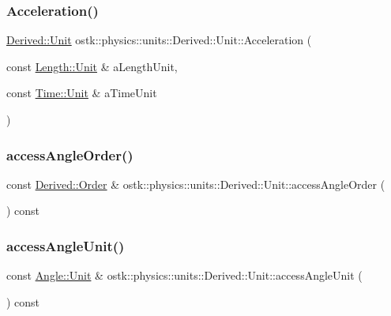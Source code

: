 \subsubsection{\texorpdfstring{Acceleration()}{Acceleration()}}
{\footnotesize\ttfamily \hyperlink{classostk_1_1physics_1_1units_1_1_derived_1_1_unit}{Derived\+::\+Unit} ostk\+::physics\+::units\+::\+Derived\+::\+Unit\+::\+Acceleration (\begin{DoxyParamCaption}\item[{const \hyperlink{classostk_1_1physics_1_1units_1_1_length_a2664470a7eedf5d45c88861fe69badea}{Length\+::\+Unit} \&}]{a\+Length\+Unit,  }\item[{const \hyperlink{classostk_1_1physics_1_1units_1_1_time_aa961f0dbca7ec297e19e15e0dfa3bb4a}{Time\+::\+Unit} \&}]{a\+Time\+Unit }\end{DoxyParamCaption})\hspace{0.3cm}{\ttfamily [static]}}

\mbox{\label{classostk_1_1physics_1_1units_1_1_derived_1_1_unit_a2920a8888f74c82166bee981196e8274}} 
\subsubsection{\texorpdfstring{access\+Angle\+Order()}{accessAngleOrder()}}
{\footnotesize\ttfamily const \hyperlink{classostk_1_1physics_1_1units_1_1_derived_1_1_order}{Derived\+::\+Order} \& ostk\+::physics\+::units\+::\+Derived\+::\+Unit\+::access\+Angle\+Order (\begin{DoxyParamCaption}{ }\end{DoxyParamCaption}) const}

\mbox{\label{classostk_1_1physics_1_1units_1_1_derived_1_1_unit_a38e9787eadca312e78314e0b10d30ff2}} 
\subsubsection{\texorpdfstring{access\+Angle\+Unit()}{accessAngleUnit()}}
{\footnotesize\ttfamily const \hyperlink{classostk_1_1physics_1_1units_1_1_angle_aea1f8018b1d378b9dee56959d8eb9def}{Angle\+::\+Unit} \& ostk\+::physics\+::units\+::\+Derived\+::\+Unit\+::access\+Angle\+Unit (\begin{DoxyParamCaption}{ }\end{DoxyParamCaption}) const}

